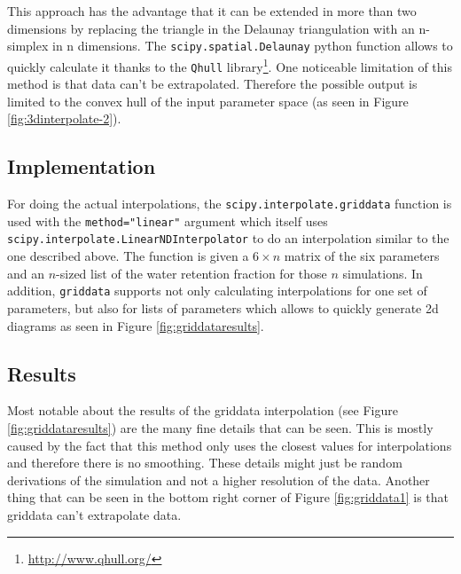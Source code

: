 This approach has the advantage that it can be extended in more than two dimensions by replacing the triangle in the Delaunay triangulation with an n-simplex in n dimensions. The \texttt{scipy.spatial.Delaunay} python function allows to quickly calculate it thanks to the \texttt{Qhull} library\footnote{\url{http://www.qhull.org/}}. One noticeable limitation of this method is that data can't be extrapolated. Therefore the possible output is limited to the convex hull of the input parameter space (as seen in Figure \ref{fig:3dinterpolate-2}).

\subsection{Implementation}
\label{sec:griddata-implementation}
For doing the actual interpolations, the \texttt{scipy.interpolate.griddata} function is used with the \texttt{method="linear"} argument which itself uses \texttt{scipy.interpolate.LinearNDInterpolator} to do an interpolation similar to the one described above. The function is given a $6\times n$ matrix of the six parameters and an $n$-sized list of the water retention fraction for those $n$ simulations. In addition, \texttt{griddata} supports not only calculating interpolations for one set of parameters, but also for lists of parameters which allows to quickly generate 2d diagrams as seen in  Figure \ref{fig:griddataresults}.

\subsection{Results}

Most notable about the results of the griddata interpolation (see Figure \ref{fig:griddataresults}) are the many fine details that can be seen. This is mostly caused by the fact that this method only uses the closest values for interpolations and therefore there is no smoothing. These details might just be random derivations of the simulation and not a higher resolution of the data. Another thing that can be seen in the bottom right corner of Figure \ref{fig:griddata1} is that griddata can't extrapolate data.


